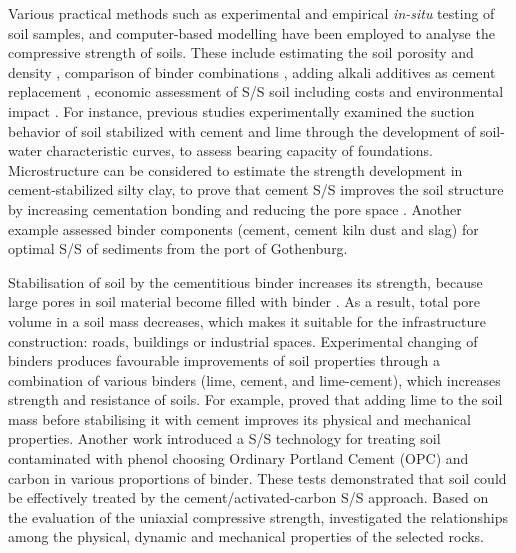 \documentclass[10pt,twoside,twocolumn,a4paper]{article}
\begin{document}
Various practical methods such as experimental and empirical \emph{in-situ} testing of soil samples, and computer-based modelling have been employed to analyse the compressive strength of soils. These include estimating the soil porosity \cite{Lemenkov2021a,Uyanik} and density \cite{Consoli,Lemenkov2021b}, comparison of binder combinations \cite{Bernal}, adding alkali additives as cement replacement \cite{Eyo}, economic assessment of S/S soil including costs and environmental impact \cite{Rocha}. For instance, previous studies \cite{Emeryetal} experimentally examined the suction behavior of soil stabilized with cement and lime through the development of soil-water characteristic curves, to assess bearing capacity of foundations. Microstructure can be considered to estimate the strength development in cement-stabilized silty clay, to prove that cement S/S improves the soil structure by increasing cementation bonding and reducing the pore space \cite{Horpibulsuk}. Another example \cite{Lindh2021a} assessed binder components (cement, cement kiln dust and slag) for optimal S/S of sediments from the port of Gothenburg. 

Stabilisation of soil by the cementitious binder increases its strength, because large pores in soil material become filled with binder \cite{Lindh202102}. As a result, total pore volume in a soil mass decreases, which makes it suitable for the infrastructure construction: roads, buildings or industrial spaces. Experimental changing of binders produces favourable improvements of soil properties through a combination of various binders (lime, cement, and lime-cement), which increases strength and resistance of soils. For example, \cite{Mahmood} proved that adding lime to the soil mass before stabilising it with cement improves its physical and mechanical properties. Another work \cite{Suetal2009} introduced a S/S technology for treating soil contaminated with phenol choosing Ordinary Portland Cement (OPC) and carbon in various proportions of binder. These tests demonstrated that soil could be effectively treated by the cement/activated-carbon S/S approach. Based on the evaluation of the uniaxial compressive strength, \cite{Diamantis} investigated the relationships among the physical, dynamic and mechanical properties of the selected rocks. 
\end{document}
